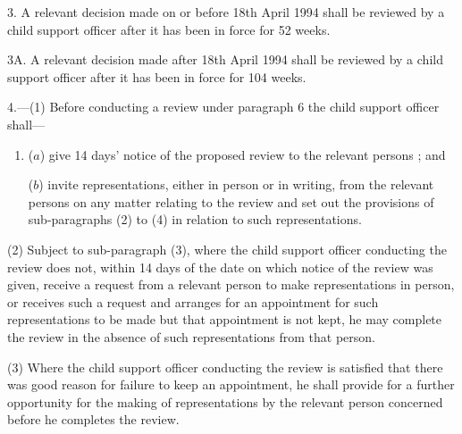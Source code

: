 \documentclass[12pt,a4paper]{article}
\begin{document}
\medskip

3.  A relevant decision 
made on or before 18th April 1994  %
shall be reviewed by a child support officer 
after  %
it has been in force for 52 weeks.


\medskip

3A.  A relevant decision made after 18th April 1994 shall be reviewed by a child support officer after it has been in force for 104 weeks.


\medskip

4.—(1) Before conducting a review under paragraph 6 the child support officer shall---
\begin{enumerate}\item[]
($a$) give 14 days' notice of the proposed review to the relevant persons%
; and

($b$) invite representations, either in person or in writing, from the relevant persons on any matter relating to the review and set out the provisions of sub-paragraphs (2) to (4) in relation to such representations.
\end{enumerate}

(2) Subject to sub-paragraph (3), where the child support officer conducting the review does not, within 14 days of the date on which notice of the review was given, receive a request from a relevant person to make representations in person, or receives such a request and arranges for an appointment for such representations to be made but that appointment is not kept, he may complete the review in the absence of such representations from that person.

(3) Where the child support officer conducting the review is satisfied that there was good reason for failure to keep an appointment, he shall provide for a further opportunity for the making of representations by the relevant person concerned before he completes the review.
\end{document}
